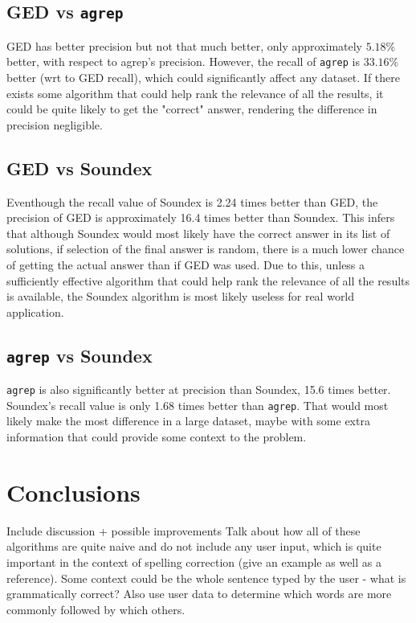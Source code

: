 \documentclass[11pt]{article}
\begin{document}
\subsection{GED vs \texttt{agrep}}
GED has better precision but not that much better, only approximately \(5.18\%\) better, with respect to agrep's precision. However, the recall of \texttt{agrep} is \(33.16\%\) better (wrt to GED recall), which could significantly affect any dataset. If there exists some algorithm that could help rank the relevance of all the results, it could be quite likely to get the "correct" answer, rendering the difference in precision negligible. %
 

 
\subsection{GED vs Soundex}
Eventhough the recall value of Soundex is 2.24 times better than GED, the precision of GED is approximately 16.4 times better than Soundex. This infers that although Soundex would most likely have the correct answer in its list of solutions, if selection of the final answer is random, there is a much lower chance of getting the actual answer than if GED was used. Due to this, unless a sufficiently effective algorithm that could help rank the relevance of all the results is available, the Soundex algorithm is most likely useless for real world application. %

\subsection{\texttt{agrep} vs Soundex}
\texttt{agrep} is also significantly better at precision than Soundex, 15.6 times better. Soundex's recall value is only 1.68 times better than \texttt{agrep}. That would most likely make the most difference in a large dataset, maybe with some extra information that could provide some context to the problem. %

\section{Conclusions}

Include discussion + possible improvements
Talk about how all of these algorithms are quite naive and do not include any user input, which is quite important in the context of spelling correction (give an example as well as a reference). Some context could be the whole sentence typed by the user - what is grammatically correct? Also use user data to determine which words are more commonly followed by which others.
\end{document}
